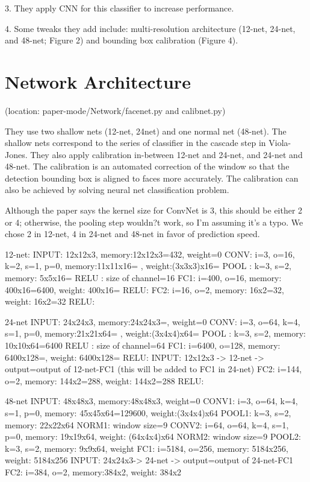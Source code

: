 \documentclass[twoside]{article}
\theoremstyle{definition}
\theoremstyle{definition}
\theoremstyle{remark}
\begin{document}
3. They apply CNN for this classifier to increase performance. 

4. Some tweaks they add include: multi-resolution architecture (12-net, 24-net, and 48-net; Figure 2) and bounding box calibration (Figure 4). 

\section{Network Architecture}

(location: paper-mode/Network/facenet.py and calibnet.py)

They use two shallow nets (12-net, 24net) and one normal net (48-net). The shallow nets correspond to the series of classifier in the cascade step in Viola-Jones. They also apply calibration in-between 12-net and 24-net, and 24-net and 48-net. The calibration is an automated correction of the window so that the detection bounding box is aligned to faces more accurately. The calibration can also be achieved by solving neural net classification problem. 

Although the paper says the kernel size for ConvNet is 3, this should be either 2 or 4; otherwise, the pooling step wouldn?t work, so I'm assuming it's a typo. We chose 2 in 12-net, 4 in 24-net and 48-net in favor of prediction speed. 

12-net:
INPUT: 12x12x3, memory:12x12x3=432, weight=0
CONV: i=3, o=16, k=2, s=1, p=0, memory:11x11x16= , weight:(3x3x3)x16=
POOL : k=3, s=2, memory: 5x5x16=  
RELU : size of channel=16
FC1: i=400, o=16, memory: 400x16=6400, weight: 400x16=
RELU:
FC2: i=16, o=2, memory: 16x2=32, weight: 16x2=32
RELU: 

24-net
INPUT: 24x24x3, memory:24x24x3=, weight=0
CONV: i=3, o=64, k=4, s=1, p=0, memory:21x21x64= , weight:(3x4x4)x64=
POOL : k=3, s=2, memory: 10x10x64=6400 
RELU : size of channel=64
FC1: i=6400, o=128, memory: 6400x128=, weight: 6400x128=
RELU:
	INPUT: 12x12x3 -> 12-net -> output=output of 12-net-FC1 (this will be added to FC1 in 24-net)
FC2: i=144, o=2, memory: 144x2=288, weight: 144x2=288
RELU:

48-net
INPUT: 48x48x3, memory:48x48x3, weight=0
CONV1: i=3, o=64, k=4, s=1, p=0, memory: 45x45x64=129600, weight:(3x4x4)x64
POOL1: k=3, s=2, memory: 22x22x64
NORM1: window size=9
CONV2: i=64, o=64, k=4, s=1, p=0, memory: 19x19x64, weight: (64x4x4)x64
NORM2: window size=9
POOL2: k=3, s=2, memory: 9x9x64, weight
FC1: i=5184, o=256, memory: 5184x256, weight: 5184x256
	INPUT: 24x24x3-> 24-net -> output=output of 24-net-FC1
FC2: i=384, o=2, memory:384x2, weight: 384x2
\end{document}
